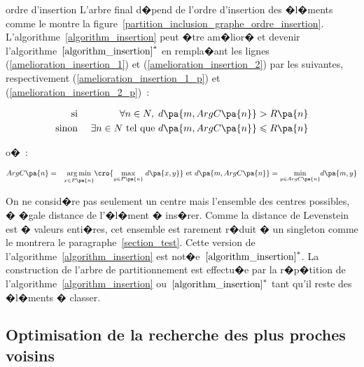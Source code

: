 \begin{xremark}{ordre d'insertion}
L'arbre final d�pend de l'ordre d'insertion des �l�ments comme le montre la 
figure~\ref{partition_inclusion_graphe_ordre_insertion}. L'algorithme~\ref{algorithm_insertion} peut �tre am�lior� et devenir l'algorithme~$\ref{algorithm_insertion}^*$ en rempla�ant les lignes (\ref{amelioration_insertion_1}) et (\ref{amelioration_insertion_2}) par les suivantes, respectivement (\ref{amelioration_insertion_1_p}) et (\ref{amelioration_insertion_2_p})~:

    \begin{eqnarray}
    \text{si }      && \forall n \in N, \; d\pa{m,ArgC\pa{n}} > R\pa{n} \label{amelioration_insertion_1_p} \\
    \text{sinon }   && \exists n \in N \text{ tel que } d\pa{m,ArgC\pa{n}} \leqslant R\pa{n}
    \label{amelioration_insertion_2_p}
    \end{eqnarray}

o�~:

    \begin{eqnarray*}
    ArgC\pa{n}            &=&     \underset{x \in P\pa{n}} {\arg \min} 
                                                                \cro{  \underset{y \in P\pa{n}} {\max} \; d\pa{x,y}} \text{ et }
    d\pa{m,ArgC\pa{n}}    =     \underset{y \in ArgC\pa{n}} {\min } d\pa{m,y}
    \end{eqnarray*}

On ne consid�re pas seulement un centre mais l'ensemble des centres possibles, � �gale distance de l'�l�ment � ins�rer. Comme la distance de Levenstein est � valeurs enti�res, cet ensemble est rarement r�duit � un singleton comme le montrera le paragraphe~\ref{section_test}. Cette version de l'algorithme~\ref{algorithm_insertion} est not�e~$\ref{algorithm_insertion}^*$. La construction de l'arbre de partitionnement est effectu�e par la r�p�tition de l'algorithme~\ref{algorithm_insertion} ou~$\ref{algorithm_insertion}^*$ tant qu'il reste des �l�ments � classer.


\end{xremark}













\subsection{Optimisation de la recherche des plus proches voisins}
\label{section_optimisation_distance}

